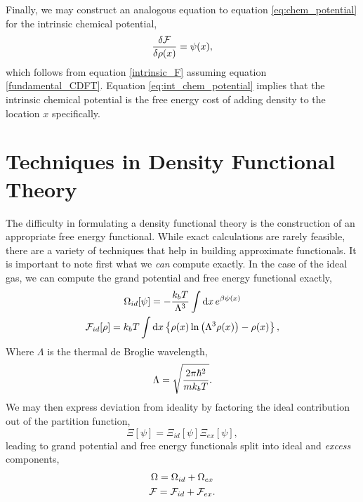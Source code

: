 Finally, we may construct an analogous equation to equation
\ref{eq:chem_potential} for the intrinsic chemical potential,
%
\begin{equation}
    \label{eq:int_chem_potential} 
    \frac{\delta \mathcal{F}}{\delta \rho(x)} = \psi(x),
\end{equation}
%
which follows from equation \ref{intrinsic_F} assuming equation
\ref{fundamental_CDFT}. Equation \ref{eq:int_chem_potential} implies that the
intrinsic chemical potential is the free energy cost of adding density to the
location $x$ specifically. 

\section{Techniques in Density Functional Theory} %

The difficulty in formulating a density functional theory is the construction
of an appropriate free energy functional.  While exact calculations are rarely
feasible, there are a variety of techniques that help in building approximate
functionals.  It is important to note first what we \textit{can} compute
exactly.  In the case of the ideal gas, we can compute the grand potential and
free energy functional exactly,
%
\begin{gather}
    \Omega_{id}[\psi] = -\frac{k_bT}{\Lambda^{3}} 
        \int\mathrm{d}x\,e^{\beta\psi(x)} \\ 
    \mathcal{F}_{id}[\rho] = k_bT\int \mathrm{d}x
        \left\lbrace \rho(x) \ln\left(\Lambda^3\rho(x)\right) - \rho(x) \right\rbrace,
    \label{F_ideal}
\end{gather}
% 
Where $\Lambda$ is the thermal de Broglie wavelength,
%
\begin{equation}
    \Lambda = \sqrt{\frac{2 \pi \hbar^2}{m k_b T}}.
\end{equation}
%
We may then express deviation from ideality by factoring the ideal contribution
out of the partition function,
%
\begin{equation}
    \Xi[\psi] = \Xi_{id}[\psi]\Xi_{ex}[\psi],
\end{equation}
%
leading to grand potential and free energy functionals split into ideal and
\textit{excess} components,
%
\begin{gather}
    \Omega = \Omega_{id} + \Omega_{ex} \\
    \mathcal{F} = \mathcal{F}_{id} + \mathcal{F}_{ex}.
\end{gather}

